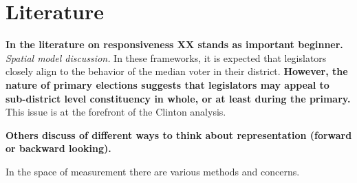 \documentclass[10pt,letterpaper]{article}
\begin{document}
\section{Literature} 
\textbf{In the literature on responsiveness XX stands as important beginner.} \textit{Spatial model discussion.} In these frameworks, it is expected that legislators closely align to the behavior of the median voter in their district. \textbf{However, the nature of primary elections suggests that legislators may appeal to sub-district level constituency in whole, or at least during the primary.} This issue is at the forefront of the Clinton analysis. 

 \textbf{Others discuss of different ways to think about representation (forward or backward looking).} 
 
In the space of measurement there are various methods and concerns. 
\end{document}
